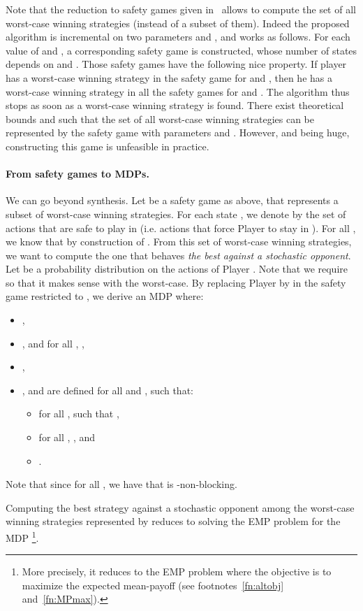 Note that the reduction to safety games given in~\cite{DBLP:journals/corr/abs-1210-3539,DBLP:conf/tacas/BohyBFR13} allows to compute the set of all worst-case winning strategies (instead of a subset of them). 
Indeed the proposed algorithm is incremental on two parameters  and , and works as follows. For each value of  and , a corresponding safety game is constructed, whose number of states depends on  and . Those safety games have the following nice property. If player  has a worst-case winning strategy in the safety game for  and , then he has a worst-case winning strategy in all the safety games for  and . The algorithm thus stops as soon as a worst-case winning strategy is found. There exist theoretical bounds  and  such that the set of all worst-case winning strategies can be represented by the safety game with parameters  and . However,  and  being huge, constructing this game is unfeasible in practice. 


\paragraph{From safety games to MDPs.} We can go beyond  synthesis. Let  be a safety game as above, that represents a subset of worst-case winning strategies. 
For each state , we denote by  the set of actions that are safe to play in  (i.e. actions that force Player  to stay in ). For all , we know that  by construction of .
From this set of worst-case winning strategies, we want to compute the one that behaves \textit{the best against a stochastic opponent}. Let  be a probability distribution on the actions of Player . Note that we require  so that it makes sense with the worst-case. 
By replacing Player  by  in the safety game  restricted to , we derive an MDP  where:
\begin{itemize}
\itemsep0.1em
\item ,
\item , and for all , ,
\item ,
\item ,  and  are defined for all  and , such that:
\begin{itemize}
\item for all ,  such that ,
\item for all , , and
\item .
\end{itemize}
\end{itemize}
Note that since  for all , we have that  is -non-blocking. 

Computing the best strategy against a stochastic opponent among the worst-case winning strategies represented by  reduces to solving the EMP problem for the MDP \footnote{More precisely, it reduces to the EMP problem where the objective is to maximize the expected mean-payoff (see footnotes~\ref{fn:altobj} and~\ref{fn:MPmax}).}.

